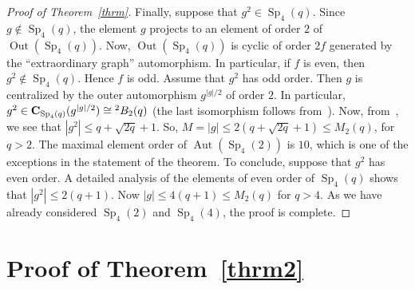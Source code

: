 \documentclass{amsart}
\begin{document}
\begin{proof}[Proof of Theorem~\ref{thrm}]
Finally, suppose that $g^2\in {\mathop{\mathrm{Sp}}}_{4}(q)$. Since $g\notin{\mathop{\mathrm{Sp}}}_4(q)$, the element $g$ projects to an element of order $2$ of ${\mathop{\textrm{Out}}}({\mathop{\mathrm{Sp}}}_4(q))$. Now, ${\mathop{\textrm{Out}}}({\mathop{\mathrm{Sp}}}_4(q))$ is cyclic of order $2f$ generated by the  ``extraordinary graph'' automorphism. In particular, if $f$ is even, then $g^2\notin {\mathop{\mathrm{Sp}}}_4(q)$. Hence $f$ is odd. Assume that $g^2$ has odd order. Then $g$ is centralized by the outer automorphism $g^{|g|/2}$ of order $2$. In particular, $g^2\in {{\bf C}_{{{{\mathop{\mathrm{Sp}}}_4(q)}}}({{{g^{|g|/2}}}})}\cong {^2}B_2(q)$ (the last isomorphism follows from~\cite[Proposition~$4.9.1$]{GLS}). Now, from~\cite{Suzuki}, we see that $|g^2|\leq q+\sqrt{2q}+1$. So, $M=|g|\leq 2(q+\sqrt{2q}+1)\leq M_2(q)$, for $q>2$. The maximal element order of ${\mathop{\mathrm{Aut}}}({\mathop{\mathrm{Sp}}}_4(2))$ is $10$, which is one of the exceptions in the statement of the theorem. To conclude, suppose that $g^2$ has even order. A detailed analysis of the elements of even order of ${\mathop{\mathrm{Sp}}}_4(q)$ shows that $|g^2|\leq 2(q+1)$. Now $|g|\leq 4(q+1)\leq M_2(q)$ for $q>4$. As we have already considered ${\mathop{\mathrm{Sp}}}_4(2)$ and ${\mathop{\mathrm{Sp}}}_4(4)$, the proof is complete. 
\end{proof}

\section{Proof of Theorem~\ref{thrm2}}\label{sec4}
\end{document}
